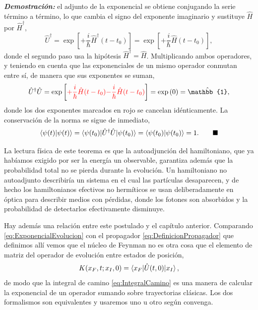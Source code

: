         \textbf{\textit{Demostración:}} el adjunto de la exponencial se obtiene conjugando la serie término a término, lo que cambia el signo del exponente imaginario y sustituye $\hat{H}$ por $\hat{H}^{\dagger}$,
        \begin{equation}\label{eq:AdjuntoU}
            \hat{U}^{\dagger} = \exp\left[+\frac{i}{\hbar}\hat{H}^{\dagger}\left(t-t_{0}\right)\right] = \exp\left[+\frac{i}{\hbar}\hat{H}\left(t-t_{0}\right)\right],
        \end{equation}
        donde el segundo paso usa la hipótesis $\hat{H}^{\dagger} = \hat{H}$. Multiplicando ambos operadores, y teniendo en cuenta que las exponenciales de un mismo operador conmutan entre sí, de manera que sus exponentes se suman,
        \begin{equation}\label{eq:ProductoU}
            \hat{U}^{\dagger}\hat{U} = \exp\left[\textcolor{red}{+\frac{i}{\hbar}\hat{H}(t-t_{0})} \textcolor{red}{-\frac{i}{\hbar}\hat{H}(t-t_{0})}\right] = \exp\left(0\right) = \hat{\mathbb{1}},
        \end{equation}
        donde los dos exponentes marcados en rojo se cancelan idénticamente. La conservación de la norma se sigue de inmediato,
        \begin{equation}\label{eq:ConservacionNorma}
            \braket{\psi(t)|\psi(t)} = \braket{\psi(t_{0})|\hat{U}^{\dagger}\hat{U}|\psi(t_{0})} = \braket{\psi(t_{0})|\psi(t_{0})} = 1 . \qquad\blacksquare
        \end{equation}

        La lectura física de este teorema es que la autoadjunción del hamiltoniano, que ya habíamos exigido por ser la energía un observable, garantiza además que la probabilidad total no se pierda durante la evolución. Un hamiltoniano no autoadjunto describiría un sistema en el cual las partículas desaparecen, y de hecho los hamiltonianos efectivos no hermíticos se usan deliberadamente en óptica para describir medios con pérdidas, donde los fotones son absorbidos y la probabilidad de detectarlos efectivamente disminuye.

        Hay además una relación entre este postulado y el capítulo anterior. Comparando \eqref{eq:ExponencialEvolucion} con el propagador \eqref{eq:DefinicionPropagador} que definimos allí vemos que el núcleo de Feynman no es otra cosa que el elemento de matriz del operador de evolución entre estados de posición,
        \begin{equation}\label{eq:PropagadorComoU}
            K(x_{F},t;x_{I},0) = \braket{x_{F}|\hat{U}(t,0)|x_{I}},
        \end{equation}
        de modo que la integral de camino \eqref{eq:IntegralCamino} es una manera de calcular la exponencial de un operador sumando sobre trayectorias clásicas. Los dos formalismos son equivalentes y usaremos uno u otro según convenga.

